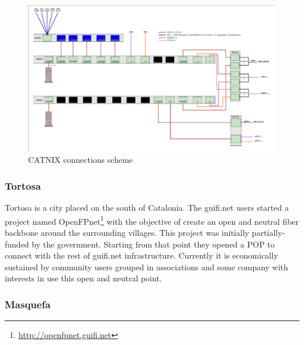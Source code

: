 \begin{figure}[htbp]
  \centering
  \includegraphics[scale=.75]{sect3/figures/telvent_scheme.eps} 
  \caption{CATNIX connections scheme}
  \label{fig:telvent_scheme}
\end{figure}



\FloatBarrier
\subsubsection{Tortosa}
Tortosa is a city placed on the south of Catalonia. The guifi.net users started a project named 
OpenFPnet\footnote{\url{http://openfpnet.guifi.net}} with the objective of create an open and neutral fiber backbone 
around the surrounding villages. This project was initially partially-funded by the government. 
\newline
Starting from that point they opened a POP to connect with the rest of guifi.net infrastructure. 
Currently it is economically sustained by community users grouped in associations and some company with interests in use
this open and neutral point.


\FloatBarrier
\subsubsection{Masquefa}

